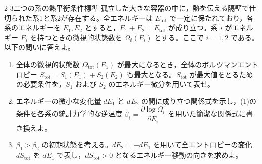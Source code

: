 
\begin{mondai}{2-3}{二つの系の熱平衡条件}{標準}
孤立した大きな容器の中に，熱を伝える隔壁で仕切られた系1と系2が存在する。全エネルギーは $E_{\mathrm{tot}}$ で一定に保たれており，各系のエネルギーを $E_1, E_2$ とすると，$E_1 + E_2 = E_{\mathrm{tot}}$ が成り立つ。系 $i$ がエネルギー $E_i$ を持つときの微視的状態数を $\Omega_i(E_i)$ とする。ここで $i=1, 2$ である。以下の問いに答えよ。

\begin{enumerate}
  \item 全体の微視的状態数 $\Omega_{\mathrm{tot}}(E_1)$ が最大になるとき，全体のボルツマンエントロピー $S_{\mathrm{tot}} = S_1(E_1) + S_2(E_2)$ も最大となる。$S_{\mathrm{tot}}$ が最大値をとるための必要条件を，$S_1$ および $S_2$ のエネルギー微分を用いて表せ。

  \item エネルギーの微小な変化量 $dE_1$ と $dE_2$ の間に成り立つ関係式を示し，(1)の条件を各系の統計力学的な逆温度 $\beta_i = \dfrac{\partial \log \Omega_i}{\partial E_i}$ を用いた簡潔な関係式に書き換えよ。

  \item $\beta_1>\beta_2$ の初期状態を考える。$dE_2=-dE_1$ を用いて全エントロピーの変化 $dS_{\mathrm{tot}}$ を $dE_1$ で表し，$dS_{\mathrm{tot}}>0$ となるエネルギー移動の向きを求めよ。
\end{enumerate}
\end{mondai}

